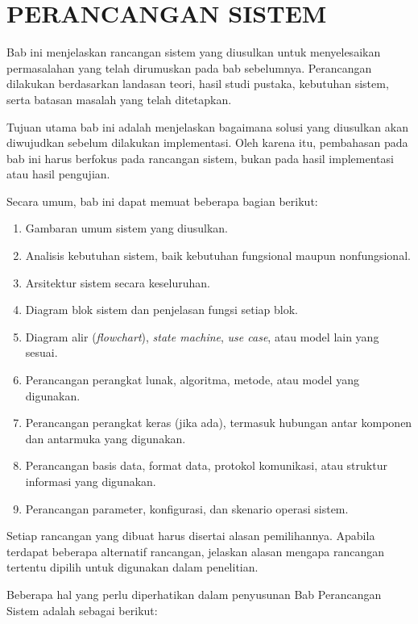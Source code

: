 \chapter{\MakeUppercase{Perancangan Sistem}}

Bab ini menjelaskan rancangan sistem yang diusulkan untuk menyelesaikan permasalahan yang telah dirumuskan pada bab sebelumnya. Perancangan dilakukan berdasarkan landasan teori, hasil studi pustaka, kebutuhan sistem, serta batasan masalah yang telah ditetapkan.

Tujuan utama bab ini adalah menjelaskan bagaimana solusi yang diusulkan akan diwujudkan sebelum dilakukan implementasi. Oleh karena itu, pembahasan pada bab ini harus berfokus pada rancangan sistem, bukan pada hasil implementasi atau hasil pengujian.

Secara umum, bab ini dapat memuat beberapa bagian berikut:

\begin{enumerate}[topsep=0pt,itemsep=0pt,parsep=0pt,leftmargin=*]
\item Gambaran umum sistem yang diusulkan.
\item Analisis kebutuhan sistem, baik kebutuhan fungsional maupun nonfungsional.
\item Arsitektur sistem secara keseluruhan.
\item Diagram blok sistem dan penjelasan fungsi setiap blok.
\item Diagram alir (\textit{flowchart}), \textit{state machine}, \textit{use case}, atau model lain yang sesuai.
\item Perancangan perangkat lunak, algoritma, metode, atau model yang digunakan.
\item Perancangan perangkat keras (jika ada), termasuk hubungan antar komponen dan antarmuka yang digunakan.
\item Perancangan basis data, format data, protokol komunikasi, atau struktur informasi yang digunakan.
\item Perancangan parameter, konfigurasi, dan skenario operasi sistem.
\end{enumerate}

Setiap rancangan yang dibuat harus disertai alasan pemilihannya. Apabila terdapat beberapa alternatif rancangan, jelaskan alasan mengapa rancangan tertentu dipilih untuk digunakan dalam penelitian.

Beberapa hal yang perlu diperhatikan dalam penyusunan Bab Perancangan Sistem adalah sebagai berikut:

